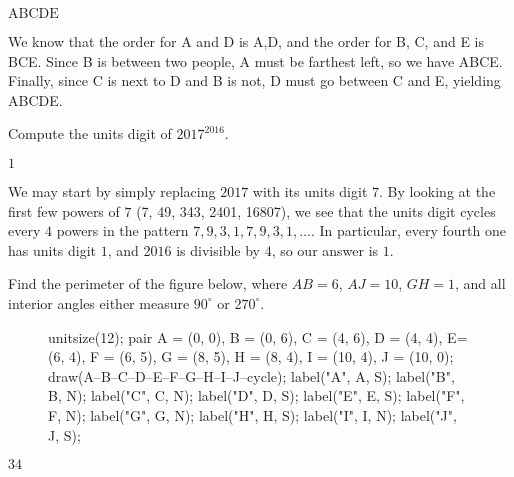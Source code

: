 \documentclass[11pt]{article}
\begin{document}
\begin{answer}
$\boxed{\text{ABCDE}}$
\end{answer}

\begin{solution}
We know that the order for A and D is A,D, and the order for B, C, and E is BCE. Since B is between two people, A must be farthest left, so we have ABCE. Finally, since C is next to D and B is not, D must go between C and E, yielding ABCDE.
\end{solution}


\begin{problem}
Compute the units digit of $2017^{2016}$.
\end{problem}

\begin{answer}
$\boxed{1}$
\end{answer}

\begin{solution}
We may start by simply replacing $2017$ with its units digit $7$. By looking at the first few powers of $7$ (7, 49, 343, 2401, 16807), we see that the units digit cycles every $4$ powers in the pattern $7, 9, 3, 1, 7, 9, 3, 1, \ldots$. In particular, every fourth one has units digit $1$, and $2016$ is divisible by $4$, so our answer is $\boxed{1}$.
\end{solution}


\begin{problem}%
Find the perimeter of the figure below, where $AB = 6$, $AJ = 10$, $GH = 1$, and all interior angles either measure $90^\circ$ or $270^\circ$.
\begin{figure}[h]
	\begin{center}
		\begin{asy}
		unitsize(12);
		pair A = (0, 0), B = (0, 6), C = (4, 6), D = (4, 4), E= (6, 4), F = (6, 5), G = (8, 5), H = (8, 4), I = (10, 4), J = (10, 0);
		draw(A--B--C--D--E--F--G--H--I--J--cycle);
		label("A", A, S);
		label("B", B, N);
		label("C", C, N);
		label("D", D, S);
		label("E", E, S);
		label("F", F, N);
		label("G", G, N);
		label("H", H, S);
		label("I", I, N);
		label("J", J, S);
		\end{asy}
	\end{center}
\end{figure}
\end{problem}

\begin{answer}
$\boxed{34}$
\end{answer}
\end{document}
